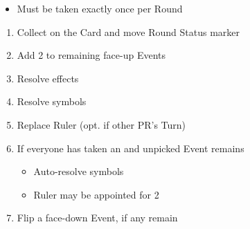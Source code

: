 \documentclass[10pt]{article}
\begin{document}
\addbackground
\addfooter


\begin{itemize}
	\item Must be taken exactly once per Round
\end{itemize}
\begin{enumerate}
	\item Collect \ducats on the Card and move Round Status marker
	\item Add 2 \ducats to remaining face-up Events
	\item Resolve effects
	\item Resolve symbols
	\item Replace Ruler (opt. if other PR's Turn)
	\item If everyone has taken an  and unpicked Event remains
	\begin{itemize}
		\item Auto-resolve symbols
		\item Ruler may be appointed for 2\adminpower
	\end{itemize}
	\item Flip a face-down Event, if any remain
\end{enumerate}
\end{document}
